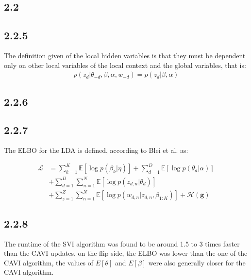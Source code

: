 \documentclass{article}
\begin{document}
\begin{multicols}{2}
    \section*{2.2}
    \subsection*{2.2.5} 
    The definition given of the local hidden variables is that they must be dependent
    only on other local variables of the local context and the global variables, that is:
    \begin{align}
        p(z_{d}|\theta_{-d}, \beta, \alpha, w_{-d}) = p(z_{d} | \beta, \alpha)
    \end{align}
    \subsection*{2.2.6}





    \subsection*{2.2.7}

    The ELBO for the LDA is defined, according to Blei et al. \cite{blei2009visualizing} as:
    
    \begin{equation}
        \begin{aligned}
            \mathcal{L} &= \sum_{k=1}^{K} \mathbb{E}[\log p(\beta_k | \eta)]+\sum_{d=1}^{D} \mathbb{E}[\log p(\theta_d | \alpha)] \\
            &+ \sum_{d=1}^{D} \sum_{n=1}^{N} \mathbb{E}[\log p(z_{d,n} | \theta_d)] \\
            &+ \sum_{z=1}^{Z} \sum_{n=1}^{N} \mathbb{E}[\log p(w_{d,n} | z_{d,n}, \beta_{1:K})] + \mathcal{H}(\mathbf{g})
        \end{aligned}
    \end{equation}

    \subsection*{2.2.8}

    The runtime of the SVI algorithm was found to be around 1.5 to 3 times faster than the CAVI updates, on the flip side, the ELBO was lower
    than the one of the CAVI algorithm, the values of $E[\theta]$ and $E[\beta]$ were also generally closer for the CAVI algorithm.    



\end{multicols}
\end{document}
